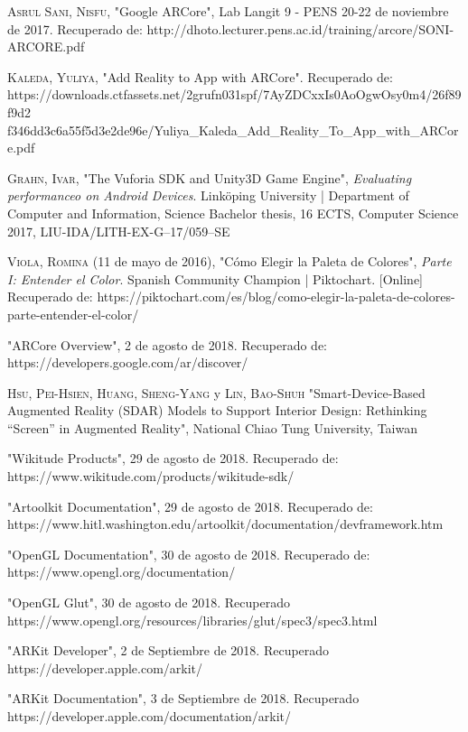 \begin{thebibliography}{X}
	 \textsc{Asrul Sani, Nisfu}, "Google ARCore", Lab Langit 9 - PENS 20-22 de noviembre de 2017. Recuperado de: http://dhoto.lecturer.pens.ac.id/training/arcore/SONI-ARCORE.pdf
	
	 \textsc{Kaleda, Yuliya}, "Add Reality to App with ARCore". Recuperado de: https://downloads.ctfassets.net/2grufn031spf/7AyZDCxxIs0AoOgwOsy0m4/26f89f9d2
	f346dd3c6a55f5d3e2de96e/Yuliya\_Kaleda\_Add\_Reality\_To\_App\_with\_ARCore.pdf
	
	 \textsc{Grahn, Ivar}, "The Vuforia SDK and Unity3D Game Engine", \textit{Evaluating performanceo on Android Devices}. Linköping University | Department of Computer and Information, Science Bachelor thesis, 16 ECTS, Computer Science 2017, LIU-IDA/LITH-EX-G–17/059–SE
	
	 \textsc{Viola, Romina} (11 de mayo de 2016), "Cómo Elegir la Paleta de Colores", \textit{Parte I: Entender el Color}. Spanish Community Champion | Piktochart. [Online] Recuperado de: https://piktochart.com/es/blog/como-elegir-la-paleta-de-colores-parte-entender-el-color/
	
	 "ARCore Overview", 2 de agosto de 2018. Recuperado de: https://developers.google.com/ar/discover/
	
	 \textsc{Hsu, Pei-Hsien}, \textsc{Huang, Sheng-Yang} y \textsc{Lin, Bao-Shuh} "Smart-Device-Based Augmented Reality (SDAR) Models to Support Interior Design: Rethinking “Screen” in Augmented Reality", National Chiao Tung University, Taiwan
	
	 "Wikitude Products", 29 de agosto de 2018. Recuperado de: https://www.wikitude.com/products/wikitude-sdk/
	
	 "Artoolkit Documentation", 29 de agosto de 2018. Recuperado de:
	https://www.hitl.washington.edu/artoolkit/documentation/devframework.htm
	
	
	 "OpenGL Documentation", 30 de agosto de 2018. Recuperado de:
	https://www.opengl.org/documentation/
	
	 "OpenGL Glut", 30 de agosto de 2018. Recuperado
	https://www.opengl.org/resources/libraries/glut/spec3/spec3.html
	
	 "ARKit Developer", 2 de Septiembre de 2018. Recuperado
	https://developer.apple.com/arkit/
	
	 "ARKit Documentation", 3 de Septiembre de 2018. Recuperado
    https://developer.apple.com/documentation/arkit/
	

\end{thebibliography}
